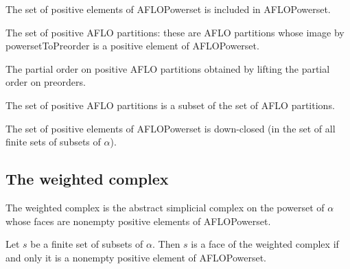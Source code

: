 \begin{sublemma}
The set of positive elements of AFLOPowerset is included in AFLOPowerset.

\end{sublemma}



\begin{subdefi}
The set of positive AFLO partitions: these are AFLO partitions whose image by powersetToPreorder is a positive element of AFLOPowerset.

\end{subdefi}

\begin{subdefi}
The partial order on positive AFLO partitions obtained by lifting the partial order on preorders.

\end{subdefi}

\begin{sublemma}
The set of positive AFLO partitions is a subset of the set of AFLO partitions.

\end{sublemma}

\begin{sublemma}
The set of positive elements of AFLOPowerset is down-closed (in the set of all finite sets of subsets of $\alpha$).

\end{sublemma}


\subsection{The weighted complex}

\begin{subdefi}[WeightedComplex]
The weighted complex is the abstract simplicial complex on the powerset of $\alpha$ whose faces are nonempty positive elements of AFLOPowerset.

\end{subdefi}

\begin{sublemma}[FacesWeightedComplex]
Let $s$ be a finite set of subsets of $\alpha$. Then $s$ is a face of the weighted complex if and only it is a nonempty positive element of AFLOPowerset.
    
\end{sublemma}


